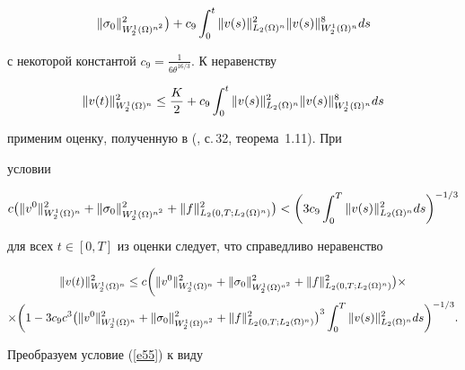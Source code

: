 \begin{pf}
\begin{multline}
\|\sig_0\|_{W^1_2(\Om)^{n^2}}^2\big)+c_9 \intl 0 t


\|v(s)\|_{L_2(\Om)^n}^2\|v(s)\|_{W_2^1(\Om)^n}^8 ds


\end{multline}


с некоторой константой $c_9=\frac{1}{6\theta^{16/3}}$. К неравенству


$$


\|v(t)\|_{W^1_2(\Om)^n}^2 \le \frac{K}{2} +c_9\intl 0 t


\|v(s)\|_{L_2(\Om)^n}^2\|v(s)\|_{W_2^1(\Om)^n}^8 ds


$$


применим оценку, полученную в (\cite{FSh}, с.\,32, теорема~1.11). При


условии


\begin{equation}\label{e55}


c \big(\|v^0\|_{W^1_2(\Om)^n}^2 +


\|\sig_0\|_{W^1_2(\Om)^{n^2}}^2+


\|f\|_{L_2(0,T;L_2(\Om)^n)}^2 \big) < \bigg(3c_9\intl 0 T


\|v(s)\|_{L_2(\Om)^n}^2 ds \bigg)^{-1/3} 


\end{equation}


для всех $t \in[0,T]$ из оценки следует, что справедливо неравенство


\begin{multline}


\label{e56}


\|v(t)\|_{W_2^1(\Om)^n}^2 \le c \bigg(\|v^0\|_{W^1_2(\Om)^n}^2 +


\|\sig_0\|_{W^1_2(\Om)^{n^2}}^2+\|f\|_{L_2(0,T;L_2(\Om)^n)}^2 \big)\times \\


%


\times \bigg(1-3c_9 c^3 \big(\|v^0\|_{W^1_2(\Om)^n}^2 +


\|\sig_0\|_{W^1_2(\Om)^{n^2}}^2+


\|f\|_{L_2(0,T;L_2(\Om)^n)}^2 \big)^3 \intl 0 T


\|v(s)\|_{L_2(\Om)^n}^2 ds \bigg)^{-1/3}.


\end{multline}





Преобразуем условие (\ref{e55}) к виду


$$



\end{pf}
